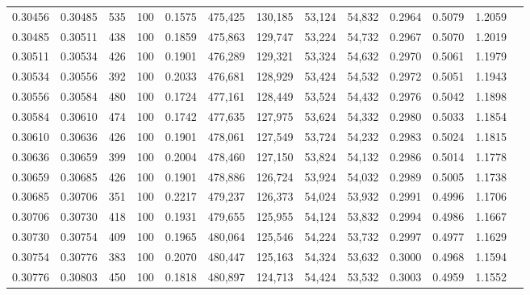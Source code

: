 \begin{tabular}{rrrrrrrrrrrrr}
0.30456 & 0.30485 &   535 & 100 &                                     0.1575 & 475,425 & 130,185 &  53,124 &  54,832 & 0.2964 & 0.5079 & 1.2059 \\
0.30485 & 0.30511 &   438 & 100 &                                     0.1859 & 475,863 & 129,747 &  53,224 &  54,732 & 0.2967 & 0.5070 & 1.2019 \\
0.30511 & 0.30534 &   426 & 100 &                                     0.1901 & 476,289 & 129,321 &  53,324 &  54,632 & 0.2970 & 0.5061 & 1.1979 \\
0.30534 & 0.30556 &   392 & 100 &                                     0.2033 & 476,681 & 128,929 &  53,424 &  54,532 & 0.2972 & 0.5051 & 1.1943 \\
0.30556 & 0.30584 &   480 & 100 &                                     0.1724 & 477,161 & 128,449 &  53,524 &  54,432 & 0.2976 & 0.5042 & 1.1898 \\
0.30584 & 0.30610 &   474 & 100 &                                     0.1742 & 477,635 & 127,975 &  53,624 &  54,332 & 0.2980 & 0.5033 & 1.1854 \\
0.30610 & 0.30636 &   426 & 100 &                                     0.1901 & 478,061 & 127,549 &  53,724 &  54,232 & 0.2983 & 0.5024 & 1.1815 \\
0.30636 & 0.30659 &   399 & 100 &                                     0.2004 & 478,460 & 127,150 &  53,824 &  54,132 & 0.2986 & 0.5014 & 1.1778 \\
0.30659 & 0.30685 &   426 & 100 &                                     0.1901 & 478,886 & 126,724 &  53,924 &  54,032 & 0.2989 & 0.5005 & 1.1738 \\
0.30685 & 0.30706 &   351 & 100 &                                     0.2217 & 479,237 & 126,373 &  54,024 &  53,932 & 0.2991 & 0.4996 & 1.1706 \\
0.30706 & 0.30730 &   418 & 100 &                                     0.1931 & 479,655 & 125,955 &  54,124 &  53,832 & 0.2994 & 0.4986 & 1.1667 \\
0.30730 & 0.30754 &   409 & 100 &                                     0.1965 & 480,064 & 125,546 &  54,224 &  53,732 & 0.2997 & 0.4977 & 1.1629 \\
0.30754 & 0.30776 &   383 & 100 &                                     0.2070 & 480,447 & 125,163 &  54,324 &  53,632 & 0.3000 & 0.4968 & 1.1594 \\
0.30776 & 0.30803 &   450 & 100 &                                     0.1818 & 480,897 & 124,713 &  54,424 &  53,532 & 0.3003 & 0.4959 & 1.1552 \\

\end{tabular}
